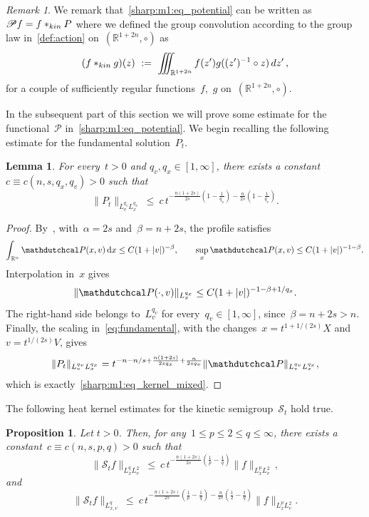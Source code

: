 \documentclass[leqno,10pt]{amsart}
\theoremstyle{plain}
\newtheorem{prop}{Proposition}[section]
\newtheorem{lemma}{Lemma}[section]
\theoremstyle{remark}
\newtheorem{rem}{Remark}[section]
\numberwithin{equation}{section}
\def\dz{\,{\rm d}z}
\def\er{\mathbb{R}}
\def\ern{\mathbb{R}^n}
\begin{document}
{  \begin{rem}\label{rem:P-conv}
  We remark that~\eqref{sharp:m1:eq_potential} can be written as~$\mathscr{P}f = f\ast_{\rm kin}P$ where we defined the group convolution according to the group law in~\eqref{def:action} on~$(\er^{1+2n},\circ)$ as
  \[
 (f\ast_{\rm kin}g)(z) \ := \ \iiint_{\er^{1+2n}}f(z')g((z')^{-1}\circ z)\dz'\,,
 \]
 for a couple of sufficiently regular functions~$f$,~$g$ on~$(\er^{1+2n},\circ)$.
  \end{rem}


In the subsequent part of this section we will prove some estimate for the functional~$\mathscr{P}$ in~\eqref{sharp:m1:eq_potential}.
We begin recalling the following estimate for the fundamental solution~$P_t$.
\begin{lemma}\label{sharp:m1:lem_kernel_scale}
For every~$t>0$ and $q_v,q_x \in [1,\infty]$, there exists a constant~$c \equiv c(n,s,q_x,q_v)>0$ such that
\begin{equation}\label{sharp:m1:eq_kernel_mixed}
\|P_t\|_{L^{q_v}_vL^{q_x}_x} \ \leq \ c\,t^{-\frac{n(1+2s)}{2s}(1-\frac{1}{q_x})-\frac{n}{2s}(1-\frac{1}{q_v})}.
\end{equation}
\end{lemma}


\begin{proof}
By~\cite[Theorem~1.1 and Lemma~1.5]{HZ24}, with~$\alpha=2s$ and~$\beta=n+2s$, the profile satisfies
\[
\int_{\ern}\mathdutchcal P(x,v)\,\mathrm dx\leq C(1+|v|)^{-\beta},
\qquad
\sup_x\mathdutchcal P(x,v)\leq C(1+|v|)^{-1-\beta}.
\]
Interpolation in~$x$ gives
\[
\|\mathdutchcal P(\cdot,v)\|_{L^{q_x}_x}
\leq C(1+|v|)^{-1-\beta+1/q_x}.
\]
The right-hand side belongs to~$L^{q_v}_v$ for every~$q_v\in[1,\infty]$, since~$\beta=n+2s>n$. Finally, the scaling in~\eqref{eq:fundamental}, with the changes~$x=t^{1+1/(2s)}X$ and~$v=t^{1/(2s)}V$, gives
\[
\|P_t\|_{L^{q_v}_vL^{q_x}_x}
=t^{-n-n/s+\frac{n(1+2s)}{2sq_x}+\frac{n}{2sq_v}}
\|\mathdutchcal P\|_{L^{q_v}_vL^{q_x}_x},
\]
which is exactly~\eqref{sharp:m1:eq_kernel_mixed}.
\end{proof}


The following heat kernel estimates for the kinetic semigroup~$\mathscr{S}_t$ hold true.

\begin{prop}
\label{sharp:m1:prop_fixed}
Let $t>0$. Then, for any~$1\leq p\leq2\leq q\leq\infty$, there exists a constant~$c\equiv c(n,s,p,q)>0$ such that 
\begin{equation}
\label{sharp:m1:eq_fixed_vector}
\|\mathscr{S}_t f\|_{L^q_xL^2_v} \ \leq \ c\, t^{-\frac{n(1+2s)}{2s}(\frac{1}{p}-\frac{1}{q})}\|f\|_{L^p_xL^2_v}\,,
\end{equation}
and
\begin{equation}
\label{sharp:m1:eq_fixed_scalar}
\|\mathscr{S}_t f\|_{L^q_{x,v}} \ \leq \ c\,t^{-\frac{n(1+2s)}{2s}\left(\frac{1}{p}-\frac{1}{q}\right)
-
\frac{n}{2s}\left(\frac{1}{2}-\frac{1}{q}\right)}
\|f\|_{L^p_xL^2_v}.
\end{equation}
\end{prop}

}
\end{document}
